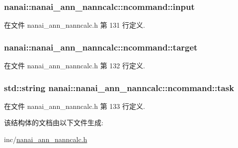 \subsubsection[{input}]{ nanai\+::nanai\+\_\+ann\+\_\+nanncalc\+::ncommand\+::input}\label{structnanai_1_1nanai__ann__nanncalc_1_1ncommand_acb609b08ab6f835678886dfeec79da71}


在文件 nanai\+\_\+ann\+\_\+nanncalc.\+h 第 131 行定义.

\hypertarget{structnanai_1_1nanai__ann__nanncalc_1_1ncommand_afd7d33dcebc41d012eeef46b346e9854}{}
\subsubsection[{target}]{ nanai\+::nanai\+\_\+ann\+\_\+nanncalc\+::ncommand\+::target}\label{structnanai_1_1nanai__ann__nanncalc_1_1ncommand_afd7d33dcebc41d012eeef46b346e9854}


在文件 nanai\+\_\+ann\+\_\+nanncalc.\+h 第 132 行定义.

\hypertarget{structnanai_1_1nanai__ann__nanncalc_1_1ncommand_a2355346d40218889f8de46778110deec}{}
\subsubsection[{task}]{\setlength{\rightskip}{0pt plus 5cm}std\+::string nanai\+::nanai\+\_\+ann\+\_\+nanncalc\+::ncommand\+::task}\label{structnanai_1_1nanai__ann__nanncalc_1_1ncommand_a2355346d40218889f8de46778110deec}


在文件 nanai\+\_\+ann\+\_\+nanncalc.\+h 第 133 行定义.



该结构体的文档由以下文件生成\+:\begin{DoxyCompactItemize}
\item 
inc/\hyperlink{nanai__ann__nanncalc_8h}{nanai\+\_\+ann\+\_\+nanncalc.\+h}\end{DoxyCompactItemize}
